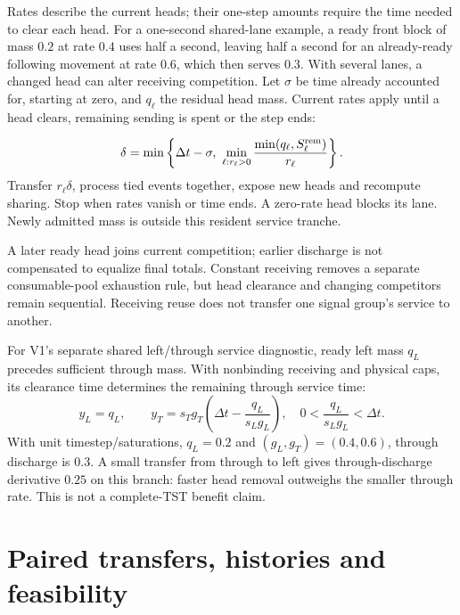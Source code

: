 \documentclass[10pt,a4paper]{article}
\newenvironment{revision}{\begingroup\color{revisionred}}{\par\endgroup}
\begin{document}
\begin{revision}
Rates describe the current heads; their one-step amounts require the
time needed to clear each head. For a one-second shared-lane example,
a ready front block of mass $0.2$ at rate $0.4$ uses half a second,
leaving half a second for an already-ready following movement at rate
$0.6$, which then serves $0.3$. With several lanes, a changed head can
alter receiving competition. Let $\sigma$ be time already accounted for,
starting at zero, and $q_\ell$ the residual head mass. Current rates apply
until a head clears, remaining sending is spent or the step ends:
\end{revision}
\begin{equation}
 \delta=\min\left\{\Delta t-\sigma,\
 \min_{\ell:r_\ell>0}
       \frac{\min(q_\ell,S_\ell^{\rm rem})}{r_\ell}\right\}.
 \label{eq:head-time}
\end{equation}
Transfer $r_\ell\delta$, process tied events together, expose new heads
and recompute sharing. Stop when rates vanish or time ends.
A zero-rate head blocks its lane. Newly admitted mass is outside this
resident service tranche.

A later ready head joins current competition; earlier discharge is not
compensated to equalize final totals. Constant receiving removes a
separate consumable-pool exhaustion rule, but head clearance and changing
competitors remain sequential. Receiving reuse does not transfer one
signal group's service to another.

For V1's separate shared left/through service diagnostic, ready left
mass $q_L$ precedes sufficient through mass. With nonbinding receiving
and physical caps, its clearance time determines the remaining through
service time:
\begin{equation}
 y_L=q_L,\qquad
 y_T=s_Tg_T\left(\Delta t-\frac{q_L}{s_Lg_L}\right),
 \quad 0<\frac{q_L}{s_Lg_L}<\Delta t.
 \label{eq:head-example}
\end{equation}
With unit timestep/saturations, $q_L=0.2$ and $(g_L,g_T)=(0.4,0.6)$,
through discharge is $0.3$. A small transfer from through to left gives
through-discharge derivative $0.25$ on this branch: faster head removal
outweighs the smaller through rate. This is not a complete-TST benefit claim.

\section{Paired transfers, histories and feasibility}
\end{document}
